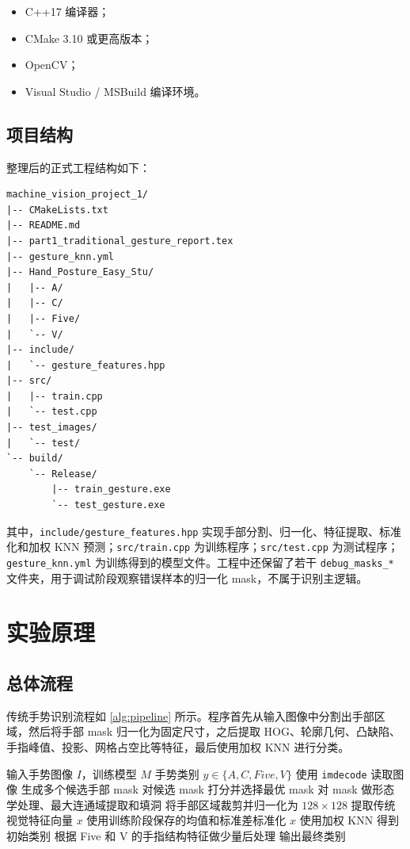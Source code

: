 \documentclass[11pt]{article}
\begin{document}
\begin{itemize}
    \item C++17 编译器；
    \item CMake 3.10 或更高版本；
    \item OpenCV；
    \item Visual Studio / MSBuild 编译环境。
\end{itemize}

\subsection{项目结构}

整理后的正式工程结构如下：

\begin{lstlisting}[language={},caption={项目主要文件结构}]
machine_vision_project_1/
|-- CMakeLists.txt
|-- README.md
|-- part1_traditional_gesture_report.tex
|-- gesture_knn.yml
|-- Hand_Posture_Easy_Stu/
|   |-- A/
|   |-- C/
|   |-- Five/
|   `-- V/
|-- include/
|   `-- gesture_features.hpp
|-- src/
|   |-- train.cpp
|   `-- test.cpp
|-- test_images/
|   `-- test/
`-- build/
    `-- Release/
        |-- train_gesture.exe
        `-- test_gesture.exe
\end{lstlisting}

其中，\texttt{include/gesture\_features.hpp} 实现手部分割、归一化、特征提取、标准化和加权 KNN 预测；\texttt{src/train.cpp} 为训练程序；\texttt{src/test.cpp} 为测试程序；\texttt{gesture\_knn.yml} 为训练得到的模型文件。工程中还保留了若干 \texttt{debug\_masks\_*} 文件夹，用于调试阶段观察错误样本的归一化 mask，不属于识别主逻辑。

\section{实验原理}

\subsection{总体流程}

传统手势识别流程如 \cref{alg:pipeline} 所示。程序首先从输入图像中分割出手部区域，然后将手部 mask 归一化为固定尺寸，之后提取 HOG、轮廓几何、凸缺陷、手指峰值、投影、网格占空比等特征，最后使用加权 KNN 进行分类。

\begin{algorithm}[H]
\caption{传统手势识别总体流程}
\label{alg:pipeline}
\begin{algorithmic}[1]
\Require 输入手势图像 $I$，训练模型 $M$
\Ensure 手势类别 $y \in \{A,C,Five,V\}$
\State 使用 \texttt{imdecode} 读取图像
\State 生成多个候选手部 mask
\State 对候选 mask 打分并选择最优 mask
\State 对 mask 做形态学处理、最大连通域提取和填洞
\State 将手部区域裁剪并归一化为 $128 \times 128$
\State 提取传统视觉特征向量 $x$
\State 使用训练阶段保存的均值和标准差标准化 $x$
\State 使用加权 KNN 得到初始类别
\State 根据 Five 和 V 的手指结构特征做少量后处理
\State 输出最终类别
\end{algorithmic}
\end{algorithm}
\end{document}
